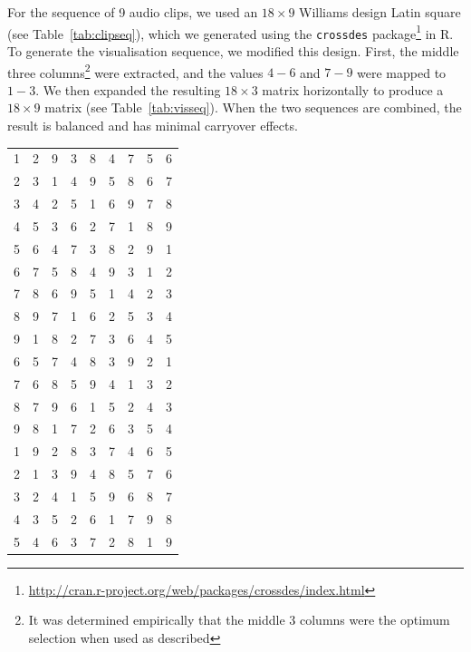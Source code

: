 For the sequence of 9 audio clips, we used an $18\times9$ Williams design Latin square (see Table~\ref{tab:clipseq}),
which we generated using the \texttt{crossdes}
package\footnote{\url{http://cran.r-project.org/web/packages/crossdes/index.html}} in R. To generate the visualisation
sequence, we modified this design. First, the middle three columns\footnote{It was determined empirically that the
  middle 3 columns were the optimum selection when used as described} were extracted, and the values $4-6$ and $7-9$
were mapped to $1-3$. We then expanded the resulting $18\times3$ matrix horizontally to produce a $18\times9$ matrix
(see Table~\ref{tab:visseq}). When the two sequences are combined, the result is balanced and has minimal carryover
effects.

\begin{table}
\centering
\begin{subtable}{.5\textwidth}
    \centering
  {\small
    \begin{tabular}{rrrrrrrrr}
      1 & 2 & 9 & 3 & 8 & 4 & 7 & 5 & 6 \\ 
      2 & 3 & 1 & 4 & 9 & 5 & 8 & 6 & 7 \\ 
      3 & 4 & 2 & 5 & 1 & 6 & 9 & 7 & 8 \\ 
      4 & 5 & 3 & 6 & 2 & 7 & 1 & 8 & 9 \\ 
      5 & 6 & 4 & 7 & 3 & 8 & 2 & 9 & 1 \\ 
      6 & 7 & 5 & 8 & 4 & 9 & 3 & 1 & 2 \\ 
      7 & 8 & 6 & 9 & 5 & 1 & 4 & 2 & 3 \\ 
      8 & 9 & 7 & 1 & 6 & 2 & 5 & 3 & 4 \\ 
      9 & 1 & 8 & 2 & 7 & 3 & 6 & 4 & 5 \\ 
      6 & 5 & 7 & 4 & 8 & 3 & 9 & 2 & 1 \\ 
      7 & 6 & 8 & 5 & 9 & 4 & 1 & 3 & 2 \\ 
      8 & 7 & 9 & 6 & 1 & 5 & 2 & 4 & 3 \\ 
      9 & 8 & 1 & 7 & 2 & 6 & 3 & 5 & 4 \\ 
      1 & 9 & 2 & 8 & 3 & 7 & 4 & 6 & 5 \\ 
      2 & 1 & 3 & 9 & 4 & 8 & 5 & 7 & 6 \\ 
      3 & 2 & 4 & 1 & 5 & 9 & 6 & 8 & 7 \\ 
      4 & 3 & 5 & 2 & 6 & 1 & 7 & 9 & 8 \\ 
      5 & 4 & 6 & 3 & 7 & 2 & 8 & 1 & 9 \\ 
    \end{tabular}
}
\end{subtable}
\end{table}
